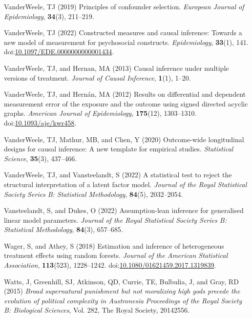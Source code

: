 \documentclass[
  single column]{article}
\newlength{\cslhangindent}
\newenvironment{CSLReferences}[2] %
 {\begin{list}{}{%
  \setlength{\itemindent}{0pt}
  \setlength{\leftmargin}{0pt}
  \setlength{\parsep}{0pt}
  \ifodd #1
   \setlength{\leftmargin}{\cslhangindent}
   \setlength{\itemindent}{-1\cslhangindent}
  \fi
  \setlength{\itemsep}{#2\baselineskip}}}
 {\end{list}}
\begin{document}
\begin{CSLReferences}{1}{0}
VanderWeele, TJ (2019) Principles of confounder selection.
\emph{European Journal of Epidemiology}, \textbf{34}(3), 211--219.

VanderWeele, TJ (2022) Constructed measures and causal inference:
Towards a new model of measurement for psychosocial constructs.
\emph{Epidemiology}, \textbf{33}(1), 141.
doi:\href{https://doi.org/10.1097/EDE.0000000000001434}{10.1097/EDE.0000000000001434}.

VanderWeele, TJ, and Hernan, MA (2013) Causal inference under multiple
versions of treatment. \emph{Journal of Causal Inference},
\textbf{1}(1), 1--20.

VanderWeele, TJ, and Hernán, MA (2012) Results on differential and
dependent measurement error of the exposure and the outcome using signed
directed acyclic graphs. \emph{American Journal of Epidemiology},
\textbf{175}(12), 1303--1310.
doi:\href{https://doi.org/10.1093/aje/kwr458}{10.1093/aje/kwr458}.

VanderWeele, TJ, Mathur, MB, and Chen, Y (2020) Outcome-wide
longitudinal designs for causal inference: A new template for empirical
studies. \emph{Statistical Science}, \textbf{35}(3), 437--466.

VanderWeele, TJ, and Vansteelandt, S (2022) A statistical test to reject
the structural interpretation of a latent factor model. \emph{Journal of
the Royal Statistical Society Series B: Statistical Methodology},
\textbf{84}(5), 2032--2054.

Vansteelandt, S, and Dukes, O (2022) Assumption-lean inference for
generalised linear model parameters. \emph{Journal of the Royal
Statistical Society Series B: Statistical Methodology}, \textbf{84}(3),
657--685.

Wager, S, and Athey, S (2018) Estimation and inference of heterogeneous
treatment effects using random forests. \emph{Journal of the American
Statistical Association}, \textbf{113}(523), 1228--1242.
doi:\href{https://doi.org/10.1080/01621459.2017.1319839}{10.1080/01621459.2017.1319839}.

Watts, J, Greenhill, SJ, Atkinson, QD, Currie, TE, Bulbulia, J, and
Gray, RD (2015) \emph{Broad supernatural punishment but not moralizing
high gods precede the evolution of political complexity in
{A}ustronesia} \emph{Proceedings of the Royal Society B: Biological
Sciences}, Vol. 282, The Royal Society, 20142556.


\end{CSLReferences}
\end{document}
